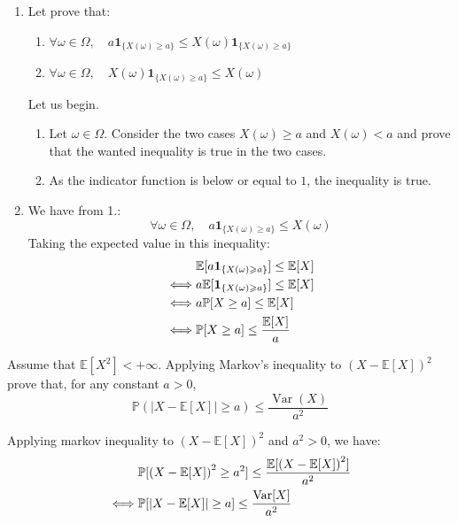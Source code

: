 \begin{solution}
  \begin{enumerate}
    \item Let prove that:
          \begin{enumerate}
            \item $\forall \omega \in \Omega, \quad a \mathbf{1}_{\{X(\omega) \geqslant a\}} \leqslant X(\omega) \mathbf{1}_{\{X(\omega) \geqslant a\}}$
            \item $\forall \omega \in \Omega, \quad X(\omega) \mathbf{1}_{\{X(\omega) \geqslant a\}} \leqslant X(\omega)$
          \end{enumerate}
          Let us begin.
          \begin{enumerate}
            \item Let $\omega \in \Omega$. Consider the two cases $X(\omega) \geq a$ and
                  $X(\omega) < a$ and prove that the wanted inequality is true in the two cases.
            \item As the indicator function is below or equal to $1$, the inequality is true.
          \end{enumerate}
    \item We have from 1.:
          \[ \forall \omega \in \Omega, \quad a \mathbf{1}_{\{X(\omega) \geqslant a\}} \leqslant X(\omega) \]
          Taking the expected value in this inequality:
          \begin{align*}
                 & \mathbb{E}[a \mathbf{1}_{\{X(\omega) \geqslant a\}}] \leq \mathbb{E}[X] \\
            \iff & a \mathbb{E}[\mathbf{1}_{\{X(\omega) \geqslant a\}}] \leq \mathbb{E}[X] \\
            \iff & a \mathbb{P}[X \geq a] \leq \mathbb{E}[X]                                   \\
            \iff & \mathbb{P}[X \geq a] \leq \frac{\mathbb{E}[X]}{a}
          \end{align*}
  \end{enumerate}
\end{solution}

\begin{Exercise}
  Assume that $\mathbb{E}\left[X^2\right]<+\infty$. Applying Markov's inequality to ${(X-\mathbb{E}[X])}^2$ prove that, for any constant $a>0$,
  \[
    \mathbb{P}(|X-\mathbb{E}[X]| \geq a) \leq \frac{\operatorname{Var}(X)}{a^2}
  \]
\end{Exercise}

\begin{solution}
  Applying markov inequality to ${(X-\mathbb{E}[X])}^2$ and $a^2 > 0$, we have:
  \begin{align*}
         & \mathbb{P}[{(X-\mathbb{E}[X])}^2 \geq a^2] \leq \frac{\mathbb{E}[{(X-\mathbb{E}[X])}^2]}{a^2} \\
    \iff & \mathbb{P}[|X-\mathbb{E}[X]| \geq a] \leq \frac{\operatorname{Var}[X]}{a^2}
  \end{align*}
\end{solution}